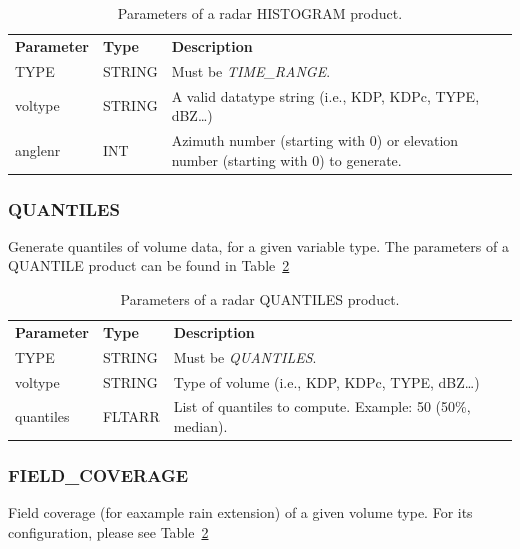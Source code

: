 \documentclass[a4paper,11pt,pdftex,twoside]{scrartcl}
\renewcommand{\bf}{\normalfont \bfseries}
\begin{document}
{{{\begin{table}[H]
 \begin{tabularx}{\textwidth}{llX}
 \bf{Parameter}  & \bf{Type}  & \bf{Description}\\
 TYPE           & STRING     & Must be \emph{TIME\_RANGE}.\\
 voltype       & STRING     & A valid datatype string (i.e., KDP, KDPc, TYPE, dBZ\dots)\\
 anglenr        & INT        & Azimuth number (starting with 0) or elevation number (starting with 0)
                               to generate.\\
 \end{tabularx}
 \caption{Parameters of a radar HISTOGRAM product.}
 \label{tab_product_histogram}
 \end{table}

\subsubsection{QUANTILES}
   \label{subsec_quantiles}
Generate quantiles of volume data, for a given variable type. The parameters of a QUANTILE product can be found in Table~\ref{tab_product_quantiles}


\begin{table}[H]
 \begin{tabularx}{\textwidth}{llX}
 \bf{Parameter}  & \bf{Type}  & \bf{Description}\\
 TYPE           & STRING     & Must be \emph{QUANTILES}.\\
 voltype        & STRING     & Type of volume (i.e., KDP, KDPc, TYPE, dBZ\dots)\\
 quantiles      & FLTARR     & List of quantiles to compute. Example: 50 (50\%, median).\\
 \end{tabularx}
 \caption{Parameters of a radar QUANTILES product.}
 \label{tab_product_quantiles}
 \end{table}


\subsubsection{FIELD\_COVERAGE}
   \label{subsec_field_coverage}
Field coverage (for eaxample rain extension) of a given volume type. For its configuration, please see Table~\ref{tab_product_quantiles}


}}}
\end{document}
